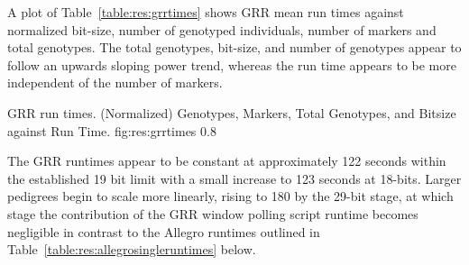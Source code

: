 A plot of Table~\ref{table:res:grrtimes} shows GRR mean run times against normalized bit-size, number of genotyped individuals, number of markers and total genotypes. The total genotypes, bit-size, and number of genotypes appear to follow an upwards sloping power trend, whereas the run time appears to be more independent of the number of markers.

	{GRR run times. (Normalized) Genotypes, Markers, Total Genotypes, and Bitsize against Run Time.}
	{fig:res:grrtimes}
	{0.8}{}


The GRR runtimes appear to be constant at approximately 122 seconds within the established 19 bit limit with a small increase to 123 seconds at 18-bits. Larger pedigrees begin to scale more linearly, rising to 180 by the 29-bit stage, at which stage the contribution of the GRR window polling script runtime becomes negligible in contrast to the Allegro runtimes outlined in Table~\ref{table:res:allegrosingleruntimes} below.



